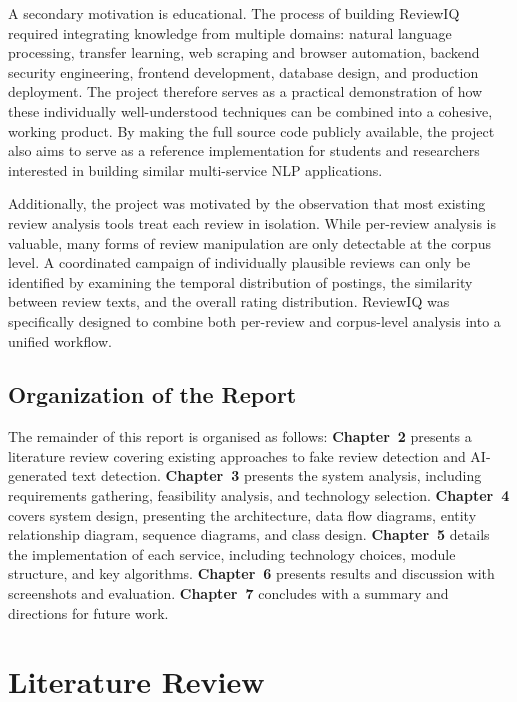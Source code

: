 \documentclass[12pt,a4paper,oneside]{report}
\begin{document}
A secondary motivation is educational. The process of building ReviewIQ
required integrating knowledge from multiple domains: natural language
processing, transfer learning, web scraping and browser automation,
backend security engineering, frontend development, database design, and
production deployment. The project therefore serves as a practical
demonstration of how these individually well-understood techniques can be
combined into a cohesive, working product. By making the full source code
publicly available, the project also aims to serve as a reference
implementation for students and researchers interested in building similar
multi-service NLP applications.

Additionally, the project was motivated by the observation that most
existing review analysis tools treat each review in isolation. While
per-review analysis is valuable, many forms of review manipulation are
only detectable at the corpus level. A coordinated campaign of individually
plausible reviews can only be identified by examining the temporal
distribution of postings, the similarity between review texts, and the
overall rating distribution. ReviewIQ was specifically designed to combine
both per-review and corpus-level analysis into a unified workflow.

\section{Organization of the Report}
The remainder of this report is organised as follows:
\textbf{Chapter~2} presents a literature review covering existing
approaches to fake review detection and AI-generated text detection.
\textbf{Chapter~3} presents the system analysis, including requirements
gathering, feasibility analysis, and technology selection.
\textbf{Chapter~4} covers system design, presenting the architecture,
data flow diagrams, entity relationship diagram, sequence diagrams, and
class design. \textbf{Chapter~5} details the implementation of each
service, including technology choices, module structure, and key
algorithms. \textbf{Chapter~6} presents results and discussion with
screenshots and evaluation. \textbf{Chapter~7} concludes with a summary
and directions for future work.

\chapter{Literature Review}
\end{document}
